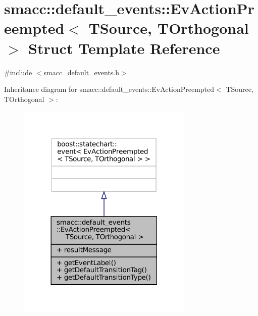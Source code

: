 \hypertarget{structsmacc_1_1default__events_1_1EvActionPreempted}{}\section{smacc\+:\+:default\+\_\+events\+:\+:Ev\+Action\+Preempted$<$ T\+Source, T\+Orthogonal $>$ Struct Template Reference}
\label{structsmacc_1_1default__events_1_1EvActionPreempted}


{\ttfamily \#include $<$smacc\+\_\+default\+\_\+events.\+h$>$}



Inheritance diagram for smacc\+:\+:default\+\_\+events\+:\+:Ev\+Action\+Preempted$<$ T\+Source, T\+Orthogonal $>$\+:
\nopagebreak
\begin{figure}[H]
\begin{center}
\leavevmode
\includegraphics[width=237pt]{structsmacc_1_1default__events_1_1EvActionPreempted__inherit__graph}
\end{center}
\end{figure}


